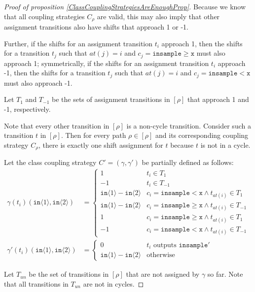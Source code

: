 \documentclass[12pt]{article}
\newcommand{\gguard}[1][x]{\texttt{insample}\geq #1}
\newcommand{\lguard}[1][x]{\texttt{insample} < #1}
\newcommand{\brangle}[1]{\langle #1 \rangle}
\theoremstyle{definition}
\begin{document}
\begin{proof}[Proof of proposition \ref{ClassCouplingStrategiesAreEnoughProp}]
    Because we know that all coupling strategies $C_{\rho}$ are valid, this may also imply that other assignment transitions also have shifts that approach 1 or -1. 

    Further, if the shifts for an assignment transition $t_i$ approach 1, then the shifts for a transition $t_j$ such that $at(j) = i$ and $c_j = \gguard[\texttt{x}]$ must also approach 1; symmetrically, if the shifts for an assignment transition $t_i$ approach -1, then the shifts for a transition $t_j$ such that $at(j) = i$ and $c_j = \lguard[\texttt{x}]$ must also approach -1. 

    Let $T_1$ and $T_{-1}$ be the sets of assignment transitions in $[\rho]$ that approach 1 and -1, respectively. 

    Note that every other transition in $[\rho]$ is a non-cycle transition. Consider such a transition $t$ in $[\rho]$. Then for every path $\rho\in [\rho]$ and its corresponding coupling strategy $C_\rho$, there is exactly one shift assignment for $t$ because $t$ is not in a cycle. 

    Let the class coupling strategy $C' = (\gamma, \gamma')$ be partially defined as follows: \begin{align*}
        \gamma(t_i)(\texttt{in}\brangle{1}, \texttt{in}\brangle{2}) &= \begin{cases}
            1 & t_i \in T_1\\
            -1 & t_i \in T_{-1}\\
            \texttt{in}\brangle{1}-\texttt{in}\brangle{2} & c_i = \lguard[\texttt{x}]\land t_{at(i)}\in T_1\\
            \texttt{in}\brangle{1}-\texttt{in}\brangle{2} & c_i = \gguard[\texttt{x}]\land t_{at(i)}\in T_{-1}\\
            1 & c_i = \gguard[\texttt{x}]\land t_{at(i)}\in T_1\\
            -1 & c_i = \lguard[\texttt{x}]\land t_{at(i)}\in T_{-1}
        \end{cases}\\
        \gamma'(t_i)(\texttt{in}\brangle{1}, \texttt{in}\brangle{2}) &=\begin{cases}
            0 & t_i\text{ outputs }\texttt{insample}'\\
            \texttt{in}\brangle{1}-\texttt{in}\brangle{2} & \text{otherwise}
        \end{cases}
    \end{align*}

    Let $T_{un}$ be the set of transitions in $[\rho]$ that are not assigned by $\gamma$ so far. Note that all transitions in $T_{un}$ are not in cycles. 


\end{proof}
\end{document}
